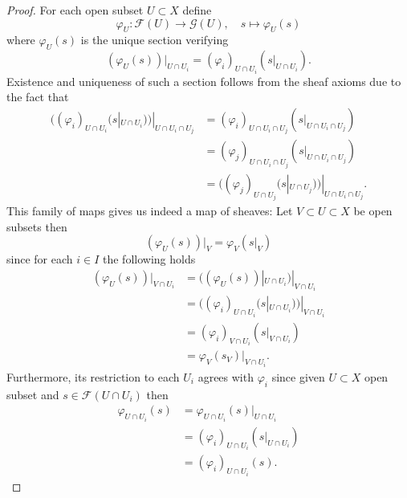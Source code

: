\documentclass{stacks-project}
\theoremstyle{plain}
\theoremstyle{definition}
\theoremstyle{remark}
\numberwithin{equation}{subsection}
\begin{document}
\begin{proof}
For each open subset $U \subset X$ define
$$
\varphi_U : \mathcal{F}(U) \to \mathcal{G}(U), \quad
s \mapsto \varphi_U(s)
$$
where $\varphi_U(s)$ is the unique section verifying
$$
(\varphi_U(s))|_{U \cap U_i}
= (\varphi_i)_{U \cap U_i}(s|_{U \cap U_i}).
$$
Existence and uniqueness of such a section
follows from the sheaf axioms
due to the fact that
\begin{align*}
((\varphi_i)_{U \cap U_i}(s|_{U \cap U_i}))|_{U \cap U_i \cap U_j}
&= (\varphi_i)_{U \cap U_i \cap U_j}(s|_{U \cap U_i \cap U_j})\\
&= (\varphi_j)_{U \cap U_i \cap U_j}(s|_{U \cap U_i \cap U_j})\\
&= ((\varphi_j)_{U \cap U_j}(s|_{U \cap U_j}))|_{U \cap U_i \cap U_j}.
\end{align*}
This family of maps gives us indeed a map of sheaves:
Let $V \subset U \subset X$ be open subsets then
$$
(\varphi_U(s))|_V
= \varphi_V(s|_V)
$$
since for each $i \in I$ the following holds
\begin{align*}
(\varphi_U(s))|_{V \cap U_i}
&= ((\varphi_U(s))|_{U \cap U_i})|_{V \cap U_i}\\
&= ((\varphi_i)_{U \cap U_i}(s|_{U \cap U_i}))|_{V \cap U_i}\\
&= (\varphi_i)_{V \cap U_i}(s|_{V \cap U_i})\\
&= \varphi_V(s_{V})|_{V \cap U_i}.
\end{align*}
Furthermore,
its restriction to each $U_i$ agrees with $\varphi_i$
since given $U \subset X$ open subset
and $s \in \mathcal{F}(U \cap U_i)$ then
\begin{align*}
\varphi_{U \cap U_i}(s)
&= \varphi_{U \cap U_i}(s)|_{U \cap U_i}\\
&= (\varphi_i)_{U \cap U_i}(s|_{U \cap U_i})\\
&= (\varphi_i)_{U \cap U_i}(s).
\end{align*}
\end{proof}
\end{document}
